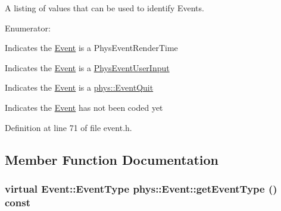 A listing of values that can be used to identify Events. \begin{Desc}
\item[Enumerator: ]\par
\begin{description}
\item[{\em 
\hypertarget{classphys_1_1Event_af5fdbb3e08d8e578d58770fbc606fda7a72c30ea5e5c4f5cb55382ad0d1317aa8}{
RenderTime}
\label{d5/dcb/classphys_1_1Event_af5fdbb3e08d8e578d58770fbc606fda7a72c30ea5e5c4f5cb55382ad0d1317aa8}
}]Indicates the \hyperlink{classphys_1_1Event}{Event} is a PhysEventRenderTime \item[{\em 
\hypertarget{classphys_1_1Event_af5fdbb3e08d8e578d58770fbc606fda7a91c3cf8e29385c1e10925d3bd4778cfc}{
UserInput}
\label{d5/dcb/classphys_1_1Event_af5fdbb3e08d8e578d58770fbc606fda7a91c3cf8e29385c1e10925d3bd4778cfc}
}]Indicates the \hyperlink{classphys_1_1Event}{Event} is a \hyperlink{classPhysEventUserInput}{PhysEventUserInput} \item[{\em 
\hypertarget{classphys_1_1Event_af5fdbb3e08d8e578d58770fbc606fda7a085b70182742e0cc874f04f8aa615ff0}{
QuitMessage}
\label{d5/dcb/classphys_1_1Event_af5fdbb3e08d8e578d58770fbc606fda7a085b70182742e0cc874f04f8aa615ff0}
}]Indicates the \hyperlink{classphys_1_1Event}{Event} is a \hyperlink{classphys_1_1EventQuit}{phys::EventQuit} \item[{\em 
\hypertarget{classphys_1_1Event_af5fdbb3e08d8e578d58770fbc606fda7a7558324b74ee7b6ec1e69d7ab1a13749}{
SystemMessage}
\label{d5/dcb/classphys_1_1Event_af5fdbb3e08d8e578d58770fbc606fda7a7558324b74ee7b6ec1e69d7ab1a13749}
}]Indicates the \hyperlink{classphys_1_1Event}{Event} has not been coded yet \end{description}
\end{Desc}



Definition at line 71 of file event.h.



\subsection{Member Function Documentation}
\hypertarget{classphys_1_1Event_ac2c0623a6bc399e62f4b9fb2c022ea73}{
\subsubsection[{getEventType}]{\setlength{\rightskip}{0pt plus 5cm}virtual {\bf Event::EventType} phys::Event::getEventType () const}}
\label{d5/dcb/classphys_1_1Event_ac2c0623a6bc399e62f4b9fb2c022ea73}


